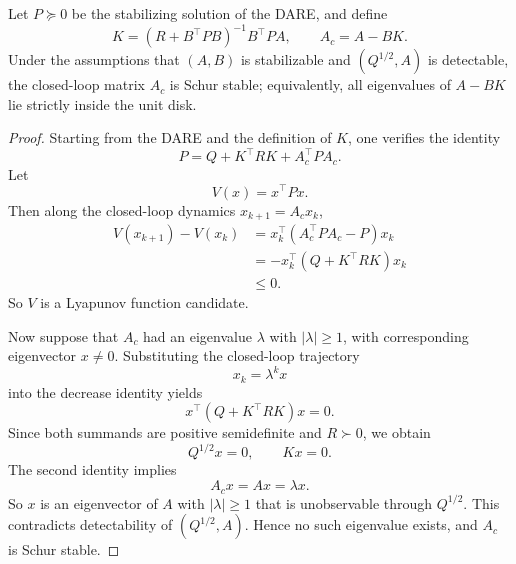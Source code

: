 \begin{theorem}\label{thm:l6-closed-loop-stability-of-infinite-horizon-lqr}
	Let $P \succeq 0$ be the stabilizing solution of the DARE, and define
	\[
		K = \left(R+B^\top P B\right)^{-1}B^\top P A,
		\qquad
		A_c = A-BK.
	\]
	Under the assumptions that $(A,B)$ is stabilizable and $(Q^{1/2},A)$ is detectable, the closed-loop matrix $A_c$ is Schur stable; equivalently, all eigenvalues of $A-BK$ lie strictly inside the unit disk.
\end{theorem}
\begin{proof}
	Starting from the DARE and the definition of $K$, one verifies the identity
	\[
		P = Q + K^\top R K + A_c^\top P A_c.
	\]
	Let
	\[
		V(x)=x^\top P x.
	\]
	Then along the closed-loop dynamics $x_{k+1}=A_c x_k$,
	\begin{align*}
		V(x_{k+1})-V(x_k)
		&= x_k^\top(A_c^\top P A_c - P)x_k \\
		&= -x_k^\top(Q+K^\top R K)x_k \\
		&\le 0.
	\end{align*}
	So $V$ is a Lyapunov function candidate.

	Now suppose that $A_c$ had an eigenvalue $\lambda$ with $|\lambda| \ge 1$, with corresponding eigenvector $x \ne 0$. Substituting the closed-loop trajectory
	\[
		x_k = \lambda^k x
	\]
	into the decrease identity yields
	\[
		x^\top(Q+K^\top R K)x = 0.
	\]
	Since both summands are positive semidefinite and $R \succ 0$, we obtain
	\[
		Q^{1/2}x=0,
		\qquad
		Kx=0.
	\]
	The second identity implies
	\[
		A_c x = A x = \lambda x.
	\]
	So $x$ is an eigenvector of $A$ with $|\lambda| \ge 1$ that is unobservable through $Q^{1/2}$. This contradicts detectability of $(Q^{1/2},A)$. Hence no such eigenvalue exists, and $A_c$ is Schur stable.
\end{proof}

